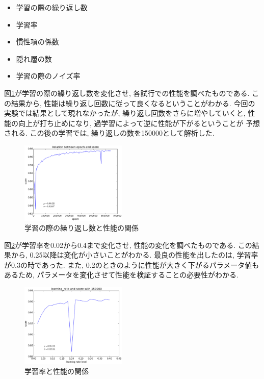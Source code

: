 \documentclass[10pt,a4paper,twocolumn]{jarticle}
\begin{document}
\begin{itemize}
  \item 学習の際の繰り返し数
  \item 学習率
  \item 慣性項の係数
  \item 隠れ層の数
  \item 学習の際のノイズ率
\end{itemize}

図\ref{fig:epoch-test}が学習の際の繰り返し数を変化させ,
各試行での性能を調べたものである. 
この結果から, 性能は繰り返し回数に従って良くなるということがわかる. 
今回の実験では結果として現れなかったが,
繰り返し回数をさらに増やしていくと, 
性能の向上が打ち止めになり, 過学習によって逆に性能が下がるということが
予想される. この後の学習では, 繰り返しの数を150000として解析した. 
\begin{figure}[htbp]
  \centering
  \includegraphics[width=0.45\textwidth]{assets/img/epoch_test_mnist.eps}
  \caption{学習の際の繰り返し数と性能の関係}
  \label{fig:epoch-test}
\end{figure}

図\ref{fig:learning-rate-test}が学習率を0.02から0.4まで変化させ, 
性能の変化を調べたものである. 
この結果から, 0.25以降は変化が小さいことがわかる. 
最良の性能を出したのは, 学習率が0.3の時であった. 
また, 0.2のときのように性能が大きく下がるパラメータ値もあるため, 
パラメータを変化させて性能を検証することの必要性がわかる. 
\begin{figure}[htbp]
  \centering
  \includegraphics[width=0.45\textwidth]{assets/img/learning_rate_test_mnist.eps}
  \caption{学習率と性能の関係}
  \label{fig:learning-rate-test}
\end{figure}
\end{document}
